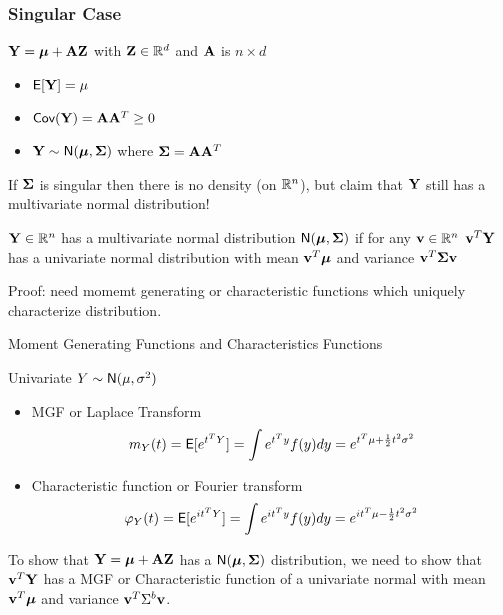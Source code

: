 \documentclass{beamer}
\begin{document}
\begin{frame} \frametitle{Singular Case}
$\mathbf{Y} = \boldsymbol{\mu} + \mathbf{A} \mathbf{Z}$  with $\mathbf{Z} \in \mathbb{R}^d$ and $\mathbf{A}$ is $n \times d$ \pause
\begin{itemize}
\item $\textsf{E}[\mathbf{Y}] = \mu$ \pause
\item $\textsf{Cov}(\mathbf{Y}) = \mathbf{A} \mathbf{A}^T \ge 0$ \pause
\item $\mathbf{Y} \sim \textsf{N}(\boldsymbol{\mu}, \boldsymbol{\Sigma})$ where $\boldsymbol{\Sigma} = \mathbf{A} \mathbf{A}^T$
\end{itemize}
  If $\boldsymbol{\Sigma}$ is singular then there is no density (on $\mathbb{R}^n$), but claim that
  $\mathbf{Y}$ still has a multivariate normal distribution!  \pause

 \begin{definition}
  $\mathbf{Y} \in \mathbb{R}^n$ has a  multivariate normal distribution $\textsf{N}(\boldsymbol{\mu},
  \boldsymbol{\Sigma})$ if for any $\mathbf{v} \in \mathbb{R}^n$ $\mathbf{v}^T\mathbf{Y}$ has a univariate normal
  distribution with mean $\mathbf{v}^T\boldsymbol{\mu}$ and variance $\mathbf{v}^T\boldsymbol{\Sigma} \mathbf{v}$
  \end{definition} \pause

Proof:  need momemt generating or characteristic functions which uniquely characterize distribution.
\end{frame}

\begin{frame}{Moment Generating Functions and Characteristics Functions}


Univariate $Y \sim \textsf{N}(\mu, \sigma^2)$  \pause
\begin{itemize}
  \item MGF or Laplace Transform
  $$m_{Y}(t) = \textsf{E}[e^{t^TY}]   = \int e^{t^Ty} f(y)  dy
= e^{t^T\mu + \frac{1}{2} t^2 \sigma^2 }
  $$
 \pause
  \item Characteristic function or Fourier transform
  $$\varphi_{Y}(t) = \textsf{E}[e^{i t^TY}]
  = \int e^{ i t^Ty} f(y)  dy
= e^{i t^T\mu  - \frac{1}{2} t^2 \sigma^2 }
  $$
\end{itemize}
 \pause

To show that $\mathbf{Y} = \boldsymbol{\mu} + \mathbf{A} \mathbf{Z}$ has a $\textsf{N}(\boldsymbol{\mu}, \boldsymbol{\Sigma})$ distribution, we need to show that
$\mathbf{v}^T\mathbf{Y}$ has a MGF or Characteristic function of a univariate normal with mean $\mathbf{v}^T\boldsymbol{\mu}$ and variance $\mathbf{v}^T\Sigma^b\mathbf{v}$.
\end{frame}
\end{document}

